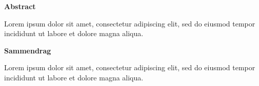 




\begin{center}\textsf{\textbf{\large Abstract}}\end{center} 

Lorem ipsum dolor sit amet, consectetur adipiscing elit, sed do eiusmod tempor incididunt ut labore et dolore magna aliqua.

\begin{center}\textsf{\textbf{\large Sammendrag}}\end{center} 

Lorem ipsum dolor sit amet, consectetur adipiscing elit, sed do eiusmod tempor incididunt ut labore et dolore magna aliqua.


 